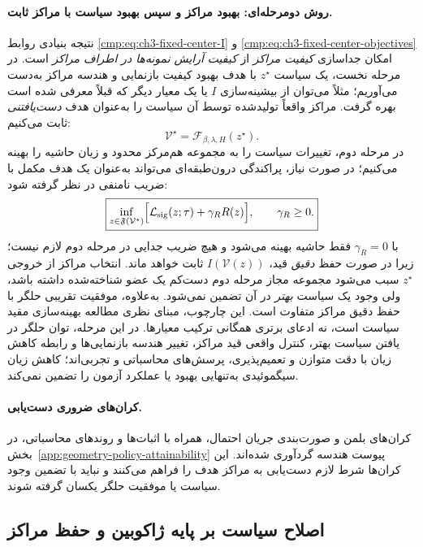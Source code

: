 \paragraph{روش دومرحله‌ای: بهبود مراکز و سپس بهبود سیاست با مراکز ثابت.}
نتیجه بنیادی روابط
\eqref{cmp:eq:ch3-fixed-center-I}
و \eqref{cmp:eq:ch3-fixed-center-objectives}
امکان جداسازی
\emph{کیفیت مراکز}
از \emph{کیفیت آرایش
نمونه‌ها در اطراف
مراکز} است.
در مرحله نخست،
یک سیاست $z^\star$
با هدف بهبود کیفیت
بازنمایی و هندسه مراکز
به‌دست می‌آوریم؛
مثلاً می‌توان از
بیشینه‌سازی $I$
یا یک معیار دیگر
که قبلاً معرفی شده
است بهره گرفت.
مراکز واقعاً
تولیدشده توسط آن
سیاست را به‌عنوان
هدف \emph{دست‌یافتنی}
ثابت می‌کنیم:
\[
\mathcal V^\star
=\mathcal F_{\beta,\lambda,H}(z^\star).
\]
در مرحله دوم،
تغییرات سیاست را
به مجموعه هم‌مرکز
محدود و زیان حاشیه
را بهینه می‌کنیم؛
در صورت نیاز،
پراکندگی درون‌طبقه‌ای
می‌تواند به‌عنوان
یک هدف مکمل
با ضریب نامنفی
در نظر گرفته شود:
\begin{equation}\label{cmp:eq:ch3-two-stage-fixed-center-optimization}
\boxed{
\inf_{z\in\mathfrak F(\mathcal V^\star)}
\Bigl[
\mathcal L_{\mathrm{sig}}(z;\tau)
+\gamma_R R(z)
\Bigr],
\qquad\gamma_R\ge0.
}
\end{equation}
با $\gamma_R=0$
فقط حاشیه بهینه می‌شود
و هیچ ضریب جدایی
در مرحله دوم لازم نیست؛
زیرا در صورت حفظ
\emph{دقیق} قید،
$I(\mathcal V(z))$
ثابت خواهد ماند.
انتخاب مراکز از خروجی
$z^\star$ سبب می‌شود
مجموعه مجاز مرحله دوم
دست‌کم یک عضو شناخته‌شده
داشته باشد، ولی
وجود یک سیاست
\emph{بهتر} در آن
تضمین نمی‌شود.
به‌علاوه، موفقیت
تقریبی حلگر با
حفظ دقیق مراکز
متفاوت است.
این چارچوب، مبنای
نظری مطالعه بهینه‌سازی
مقید سیاست است،
نه ادعای برتری همگانی
ترکیب معیارها. در این مرحله،
توان حلگر در یافتن سیاست بهتر،
کنترل واقعی قید مراکز، تغییر هندسه
بازنمایی‌ها و رابطه کاهش زیان با
دقت متوازن و تعمیم‌پذیری،
پرسش‌های محاسباتی و تجربی‌اند؛
کاهش زیان سیگموئیدی به‌تنهایی
بهبود  یا عملکرد آزمون را تضمین نمی‌کند.

\paragraph{کران‌های ضروری دست‌یابی.}
کران‌های بلمن و صورت‌بندی جریان احتمال، همراه با اثبات‌ها و روندهای محاسباتی، در بخش~\ref{app:geometry-policy-attainability} پیوست هندسه گردآوری شده‌اند. این کران‌ها شرط لازم دست‌یابی به مراکز هدف را فراهم می‌کنند و نباید با تضمین وجود سیاست یا موفقیت حلگر یکسان گرفته شوند.

\subsection{اصلاح سیاست بر پایه ژاکوبین و حفظ مراکز}

